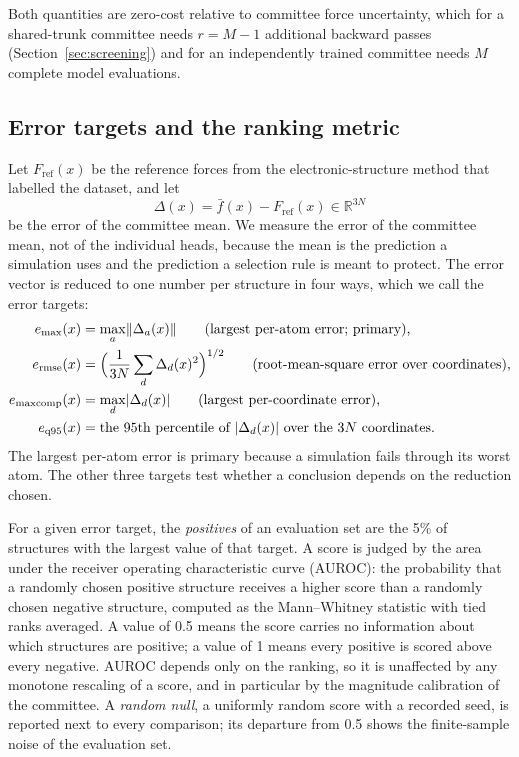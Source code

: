 Both quantities are zero-cost relative to committee force uncertainty, which
for a shared-trunk committee needs $r=M-1$ additional backward passes
(Section~\ref{sec:screening}) and for an independently trained committee needs
$M$ complete model evaluations.

\subsection{Error targets and the ranking metric}
\label{sec:metric}

Let $F_{\mathrm{ref}}(x)$ be the reference forces from the electronic-structure
method that labelled the dataset, and let
\begin{equation}
\Delta(x)=\bar f(x)-F_{\mathrm{ref}}(x)\in\mathbb{R}^{3N}
\label{eq:delta}
\end{equation}
be the error of the committee mean. We measure the error of the committee
mean, not of the individual heads, because the mean is the prediction a
simulation uses and the prediction a selection rule is meant to protect. The
error vector is reduced to one number per structure in four ways, which we call
the error targets:
\begin{align}
e_{\max}(x)&=\max_{a}\lVert\Delta_a(x)\rVert \qquad\text{(largest per-atom error; primary),}\\
e_{\mathrm{rmse}}(x)&=\Bigl(\frac{1}{3N}\sum_{d}\Delta_d(x)^2\Bigr)^{1/2} \qquad\text{(root-mean-square error over coordinates),}\\
e_{\mathrm{maxcomp}}(x)&=\max_{d}\lvert\Delta_d(x)\rvert \qquad\text{(largest per-coordinate error),}\\
e_{\mathrm{q95}}(x)&=\text{the 95th percentile of }\lvert\Delta_d(x)\rvert\text{ over the $3N$ coordinates.}
\end{align}
The largest per-atom error is primary because a simulation fails through its
worst atom. The other three targets test whether a conclusion depends on the
reduction chosen.

For a given error target, the \emph{positives} of an evaluation set are the
5\% of structures with the largest value of that target. A score is judged by
the area under the receiver operating characteristic curve (AUROC): the
probability that a randomly chosen positive structure receives a higher score
than a randomly chosen negative structure, computed as the Mann--Whitney
statistic with tied ranks averaged. A value of 0.5 means the score carries no
information about which structures are positive; a value of 1 means every
positive is scored above every negative. AUROC depends only on the ranking, so
it is unaffected by any monotone rescaling of a score, and in particular by
the magnitude calibration of the committee. A \emph{random null}, a uniformly
random score with a recorded seed, is reported next to every comparison; its
departure from 0.5 shows the finite-sample noise of the evaluation set.

